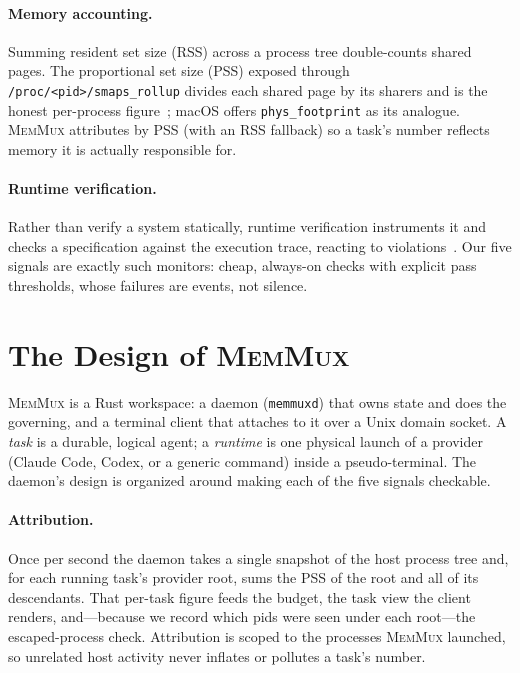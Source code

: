 \documentclass[11pt]{article}
\newcommand{\sys}{\textsc{MemMux}}
\newcommand{\code}[1]{\texttt{#1}}
\begin{document}
\paragraph{Memory accounting.} Summing resident set size (RSS) across a process tree double-counts
shared pages. The proportional set size (PSS) exposed through \code{/proc/<pid>/smaps\_rollup}
divides each shared page by its sharers and is the honest per-process figure~\citep{procfs}; macOS
offers \code{phys\_footprint} as its analogue. \sys{} attributes by PSS (with an RSS fallback) so a
task's number reflects memory it is actually responsible for.

\paragraph{Runtime verification.} Rather than verify a system statically, runtime verification
instruments it and checks a specification against the execution trace, reacting to
violations~\citep{bartocci2018introrv}. Our five signals are exactly such monitors: cheap,
always-on checks with explicit pass thresholds, whose failures are events, not silence.

\section{The Design of \sys{}}
\label{sec:design}

\sys{} is a Rust workspace: a daemon (\code{memmuxd}) that owns state and does the governing, and a
terminal client that attaches to it over a Unix domain socket. A \emph{task} is a durable, logical
agent; a \emph{runtime} is one physical launch of a provider (Claude Code, Codex, or a generic
command) inside a pseudo-terminal. The daemon's design is organized around making each of the five
signals checkable.

\paragraph{Attribution.} Once per second the daemon takes a single snapshot of the host process
tree and, for each running task's provider root, sums the PSS of the root and all of its descendants.
That per-task figure feeds the budget, the task view the client renders, and---because we record
which pids were seen under each root---the escaped-process check. Attribution is scoped to the
processes \sys{} launched, so unrelated host activity never inflates or pollutes a task's number.
\end{document}
